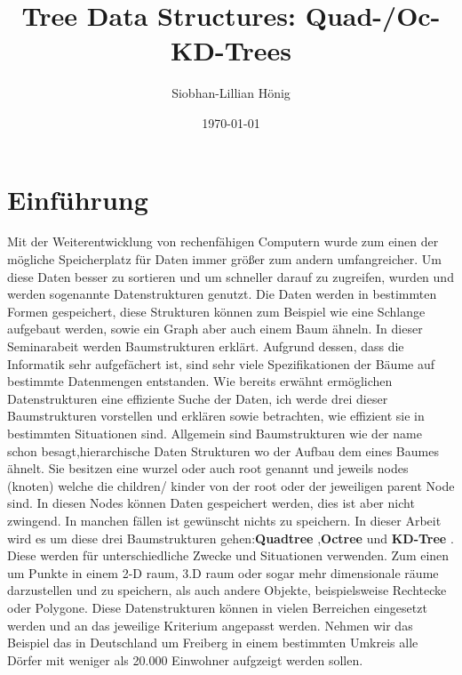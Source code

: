 \documentclass[11pt]{article}
\title{\textbf{Tree Data Structures: Quad-/Oc-KD-Trees}}
\author{Siobhan-Lillian Hönig}
\date{\today}
\newcommand{\qt}{Quadtree }
\newcommand{\oc}{Octree }
\newcommand{\kd}{KD-Tree }
\newcommand{\fett}[1]{{\bf #1}}
\begin{document}
\begin{titlepage}
    \maketitle
\end{titlepage}

\pagebreak

\pagebreak
\tableofcontents
\pagebreak



\glsaddall
\printglossary 
\pagebreak

\section{Einführung} \label{Einführung}

Mit der Weiterentwicklung von rechenfähigen Computern wurde zum einen der mögliche Speicherplatz für Daten immer größer zum andern umfangreicher. Um diese Daten besser zu sortieren und um schneller darauf zu zugreifen, wurden und werden sogenannte Datenstrukturen genutzt. Die Daten werden in bestimmten Formen gespeichert, diese Strukturen können zum Beispiel wie eine Schlange aufgebaut werden, sowie ein Graph aber auch einem Baum ähneln. 
In dieser Seminarabeit werden Baumstrukturen erklärt. Aufgrund dessen, dass die Informatik sehr aufgefächert ist, sind sehr viele Spezifikationen der Bäume auf bestimmte Datenmengen entstanden.  
Wie bereits erwähnt ermöglichen Datenstrukturen eine effiziente Suche der Daten, ich werde drei dieser Baumstrukturen vorstellen und erklären sowie betrachten, wie effizient sie in bestimmten Situationen sind. 
\newline
Allgemein sind Baumstrukturen wie der name schon besagt,hierarchische Daten Strukturen wo der Aufbau dem eines Baumes ähnelt. Sie besitzen eine wurzel oder auch root genannt und jeweils nodes (knoten) welche die children/ kinder von der root oder der jeweiligen parent Node sind.  In diesen Nodes können Daten gespeichert werden, dies ist aber nicht zwingend. In manchen fällen ist gewünscht nichts zu speichern.  
In dieser Arbeit wird es um diese drei Baumstrukturen gehen:\fett \qt ,\fett \oc und \fett \kd. Diese werden für unterschiedliche Zwecke und Situationen verwenden. Zum einen um Punkte in einem 2-D raum, 3.D raum oder sogar mehr dimensionale räume darzustellen und zu speichern, als auch andere Objekte, beispielsweise Rechtecke oder Polygone.
Diese Datenstrukturen können in vielen Berreichen eingesetzt werden und an das jeweilige Kriterium angepasst werden. Nehmen wir das Beispiel das in Deutschland um Freiberg in einem bestimmten Umkreis alle Dörfer mit weniger als 20.000 Einwohner aufgzeigt werden sollen.\newline 
\end{document}
